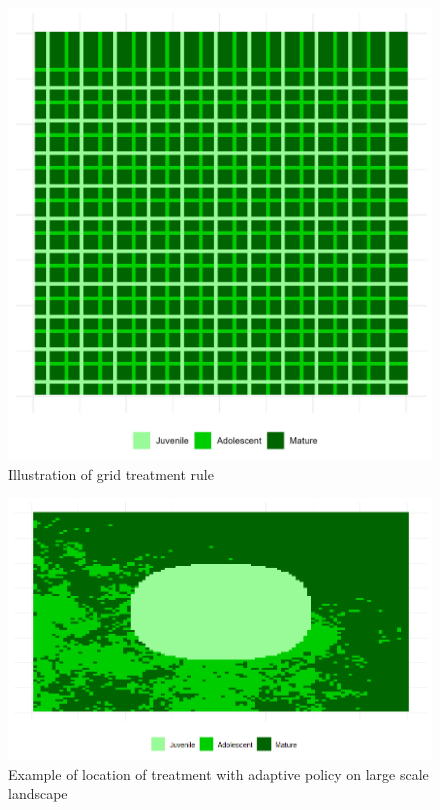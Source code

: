 \begin{figure}[h]
	\centering
	\includegraphics[width = .8\textwidth]{figures/wildland/grid_treatment.jpg}
	\caption{Illustration of grid treatment rule}
	\label{fig:grid}
\end{figure}

\begin{figure}[H]
	\centering
	\includegraphics[width = .8\textwidth]{figures/wildland/example_adaptive_treatment.jpg}
	\caption{Example of location of treatment with adaptive policy on large scale landscape}
	\label{fig:adaptive_policy}
\end{figure}





